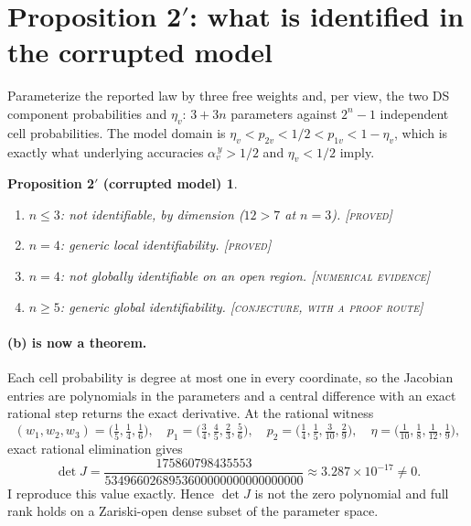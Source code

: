 \documentclass[11pt]{article}
\newtheorem*{proptwo}{Proposition 2$'$ (corrupted model)}
\theoremstyle{remark}
\newcommand{\status}[1]{\hfill{\normalfont\small\textsc{[#1]}}}
\begin{document}
\section*{Proposition 2$'$: what is identified in the corrupted model}

Parameterize the reported law by three free weights and, per view, the two DS component probabilities and $\eta_v$: $3+3n$ parameters against $2^n-1$ independent cell probabilities. The model domain is $\eta_v<p_{2v}<1/2<p_{1v}<1-\eta_v$, which is exactly what underlying accuracies $\alpha_v^{\,y}>1/2$ and $\eta_v<1/2$ imply.

\begin{proptwo}
\begin{enumerate}
\item[(a)] $n\le3$: not identifiable, by dimension ($12>7$ at $n=3$). \status{proved}
\item[(b)] $n=4$: generic local identifiability. \status{proved}
\item[(c)] $n=4$: \emph{not} globally identifiable on an open region. \status{numerical evidence}
\item[(d)] $n\ge5$: generic global identifiability. \status{conjecture, with a proof route}
\end{enumerate}
\end{proptwo}

\paragraph{(b) is now a theorem.} Each cell probability is degree at most one in every coordinate, so the Jacobian entries are polynomials in the parameters and a central difference with an exact rational step returns the exact derivative. At the rational witness
\[
(w_1,w_2,w_3)=\bigl(\tfrac15,\tfrac14,\tfrac16\bigr),\quad
p_1=\bigl(\tfrac34,\tfrac45,\tfrac23,\tfrac56\bigr),\quad
p_2=\bigl(\tfrac14,\tfrac15,\tfrac3{10},\tfrac29\bigr),\quad
\eta=\bigl(\tfrac1{10},\tfrac18,\tfrac1{12},\tfrac19\bigr),
\]
exact rational elimination gives
\[
\det J=\frac{175860798435553}{5349660268953600000000000000000}\approx3.287\times10^{-17}\neq0 .
\]
I reproduce this value exactly. Hence $\det J$ is not the zero polynomial and full rank holds on a Zariski-open dense subset of the parameter space.
\end{document}
